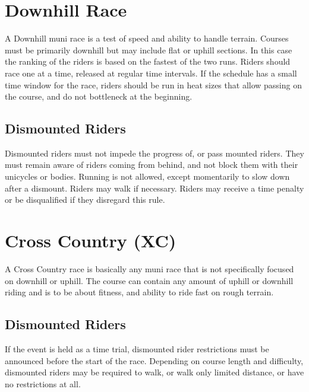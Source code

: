 \section{Downhill Race \label{sec:muni_downhill}}
A Downhill muni race is a test of speed and ability to handle terrain.
Courses must be primarily downhill but may include flat or uphill sections.
In this case the ranking of the riders is based on the fastest of the two runs.
Riders should race one at a time, released at regular time intervals.
If the schedule has a small time window for the race, riders should be run in heat sizes that allow passing on the course, and do not bottleneck at the beginning.

\subsection{Dismounted Riders}
Dismounted riders must not impede the progress of, or pass mounted riders.
They must remain aware of riders coming from behind, and not block them with their
unicycles or bodies.
Running is not allowed, except momentarily to slow down after a dismount.
Riders may walk if necessary.
Riders may receive a time penalty or be disqualified if they disregard this rule.

\section{Cross Country (XC)\label{sec:muni_xc}}
A Cross Country race is basically any muni race that is not specifically focused on downhill or uphill.
The course can contain any amount of uphill or downhill riding and is to be about fitness, and ability to ride fast on rough terrain.

\subsection{Dismounted Riders}
If the event is held as a time trial, dismounted rider restrictions must be announced before the start of the race.
Depending on course length and difficulty, dismounted riders may be required to walk, or walk only limited distance, or have no restrictions at all.

